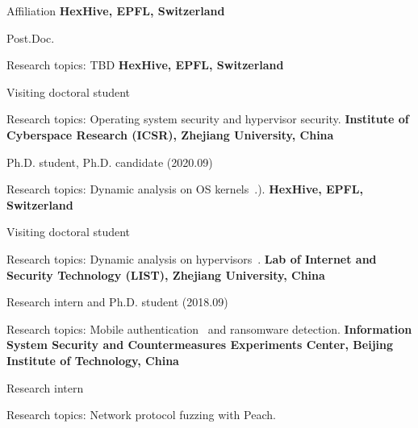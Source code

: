 \begin{rubric}{Affiliation}
\entry*[2023.11 -- 202x.xx]
	\textbf{HexHive, EPFL, Switzerland}
	\par Post.Doc.
	\par Research topics: TBD
\entry*[2023.02 -- 2023.09]
	\textbf{HexHive, EPFL, Switzerland}
	\par Visiting doctoral student
	\par Research topics: Operating system security and hypervisor security.
\entry*[2019.05 -- 2023.09]
	\textbf{Institute of Cyberspace Research (ICSR), Zhejiang University, China}
	\par Ph.D. student, Ph.D. candidate (2020.09)
	\par Research topics: Dynamic analysis on OS kernels~\cite{liu2021firmguide,jiang2021ecmo}.).
\entry*[2021.08 -- 2022.03]
	\textbf{HexHive, EPFL, Switzerland}
	\par Visiting doctoral student
	\par Research topics: Dynamic analysis on hypervisors~\cite{videzzo@2023}.
\entry*[2017.07 -- 2019.04]
    \textbf{Lab of Internet and Security Technology (LIST), Zhejiang University, China}
	\par Research intern and Ph.D. student (2018.09)
	\par Research topics: Mobile authentication~\cite{espialcog@2020,onecycleattack@2021,trapcog@2023} and ransomware detection.
\entry*[2016.09 -- 2017.06]
	\textbf{Information System Security and Countermeasures Experiments Center,
	Beijing Institute of Technology, China} 
	\par Research intern
	\par Research topics: Network protocol fuzzing with Peach.
\end{rubric}